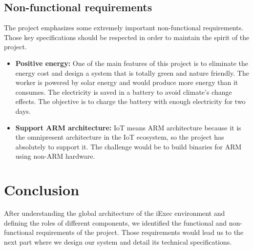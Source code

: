     \subsection{Non-functional requirements}
        The project emphasizes some extremely important non-functional requirements. Those key specifications should be
        respected in order to maintain the spirit of the project.
        \begin{itemize}
            \item \textbf{Positive energy:} One of the main features of this project is to eliminate the energy cost and
            design a system that is totally green and nature friendly. The worker is powered by solar energy and would
            produce more energy than it consumes. The electricity is saved in a battery to avoid climate's change effects.
            The objective is to charge the battery with enough electricity for two days.

            \item \textbf{Support ARM architecture:} IoT means ARM\cite{ARM} architecture because it is the
            omnipresent architecture in the IoT ecosystem, so the project has absolutely to support it. The challenge
            would be to build binaries for ARM using non-ARM hardware.
        \end{itemize}

\section{Conclusion}
    After understanding the global architecture of the iExec environment and defining the roles of different components,
    we identified the functional and non-functional requirements of the project. Those requirements would lead us to the next
    part where we design our system and detail its technical specifications.